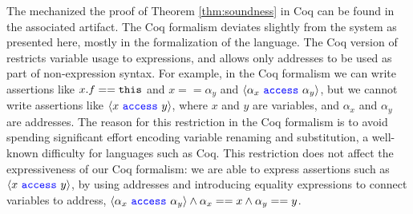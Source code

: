 The mechanized  the proof of Theorem \ref{thm:soundness} in Coq 
can be found in the associated artifact. 
The   Coq formalism deviates slightly from the system as
presented here,  mostly in the formalization of the 
\SpecO language. The Coq version of \SpecO restricts variable usage to expressions, and allows only addresses to 
be used as part of non-expression syntax. 
For example, in the Coq formalism
we can write assertions like $x.f=={\texttt{this}}$ and
$x==\alpha_y$ and  $\langle \alpha_x\ {\color{blue}\texttt{access}}\ \alpha_y \rangle$, but we cannot write assertions 
like $\langle x\ {\color{blue}\texttt{access}}\ y \rangle$, where $x$ and $y$ are variables, and $\alpha_x$ and $\alpha_y$ are
addresses.
The reason for this restriction in the Coq formalism is to avoid spending %
significant effort encoding variable
renaming and substitution, a well-known difficulty for languages such as Coq. 
This restriction does not affect the expressiveness of %
our  Coq formalism: we are
able to express assertions such as $\langle x\ {\color{blue}\texttt{access}}\ y \rangle$, by using addresses and introducing equality expressions %
to connect variables to address, \ie
 $\langle \alpha_x\ {\color{blue}\texttt{access}}\ \alpha_y \rangle \wedge \alpha_x == x \wedge \alpha_y == y$.



